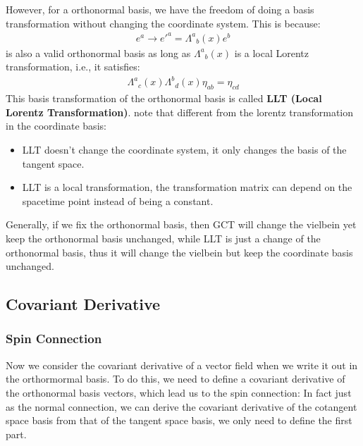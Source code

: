 However, for a orthonormal basis, we have the freedom of doing a
basis transformation without changing the coordinate system. This is because:
\begin{align}
  e^a \to e'^a = \Lambda^a{}_b(x) e^b
\end{align}
is also a valid orthonormal basis as long as $ \Lambda^a{}_b(x) $ is
a local Lorentz transformation, i.e., it satisfies:
\begin{align}
  \Lambda^a{}_c(x) \Lambda^b{}_d(x) \eta_{ab} = \eta_{cd}
\end{align}
This basis transformation of the orthonormal basis is called
\textbf{LLT (Local Lorentz Transformation)}.
note that different from the lorentz transformation in the coordinate basis:
\begin{itemize}
  \item LLT doesn't change the coordinate system, it only changes the
    basis of the tangent space.
  \item LLT is a local transformation, the transformation matrix can
    depend on the spacetime point instead of being a constant.
\end{itemize}
Generally, if we fix the orthonormal basis, then GCT will change the
vielbein yet keep the orthonormal basis unchanged, while LLT is just
a change of the orthonormal basis, thus it will change the vielbein
but keep the coordinate basis unchanged.
\subsection{Covariant Derivative}

\subsubsection{Spin Connection}

Now we consider the covariant derivative of a vector field when we
write it out in the orthormormal basis. To do this, we need to define
a covariant derivative of the orthonormal basis vectors, which lead
us to the spin connection:
In fact just as the normal connection, we can derive the covariant
derivative of the cotangent space basis from that of the tangent
space basis, we only need to define the first part.

